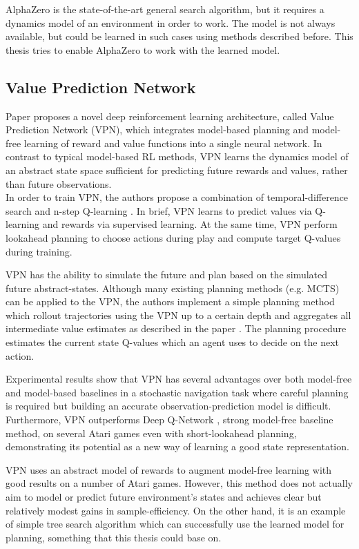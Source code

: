 AlphaZero is the state-of-the-art general search algorithm, but it requires a dynamics model of an environment in order to work. The model is not always available, but could be learned in such cases using methods described before. This thesis tries to enable AlphaZero to work with the learned model.

\subsection{Value Prediction Network}

Paper \cite{Algo.VPN} proposes a novel deep reinforcement learning architecture, called Value Prediction Network (VPN), which integrates model-based planning and model-free learning of reward and value functions into a single neural network. In contrast to typical model-based RL methods, VPN learns the dynamics model of an abstract state space sufficient for predicting future rewards and values, rather than future observations. \\
In order to train VPN, the authors propose a combination of temporal-difference search \cite{Algo.TDSearch} and n-step Q-learning \cite{Algo.A3C}. In brief, VPN learns to predict values via Q-learning and rewards via supervised learning. At the same time, VPN perform lookahead planning to choose actions during play and compute target Q-values during training.

VPN has the ability to simulate the future and plan based on the simulated future abstract-states. Although many existing planning methods (e.g. MCTS) can be applied to the VPN, the authors implement a simple planning method which rollout trajectories using the VPN up to a certain depth and aggregates all intermediate value estimates as described in the paper \cite{Algo.VPN}. The planning procedure estimates the current state Q-values which an agent uses to decide on the next action.

Experimental results show that VPN has several advantages over both model-free and model-based baselines in a stochastic navigation task where careful planning is required but building an accurate observation-prediction model is difficult. Furthermore, VPN outperforms Deep Q-Network \cite{Algo.DQN}, strong model-free baseline method, on several Atari games even with short-lookahead planning, demonstrating its potential as a new way of learning a good state representation.

VPN uses an abstract model of rewards to augment model-free learning with good results on a number of Atari games. However, this method does not actually aim to model or predict future environment's states and achieves clear but relatively modest gains in sample-efficiency. On the other hand, it is an example of simple tree search algorithm which can successfully use the learned model for planning, something that this thesis could base on.
